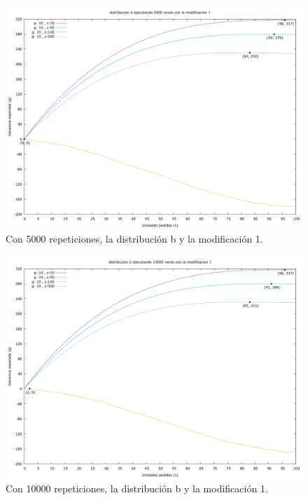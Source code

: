 \documentclass[12pt, spanish]{article}
\begin{document}
\begin{figure}[H]
	\centering
	\includegraphics[scale = 0.3]{prob_b/datos_b_5000_1.png}
	\caption{Con 5000 repeticiones, la distribución b y la modificación 1.}
	\label{fig:ej1_a_5000}

\end{figure}


\begin{figure}[H]
	\centering
	\includegraphics[scale = 0.3]{prob_b/datos_b_10000_1.png}
	\caption{Con 10000 repeticiones, la distribución b y la modificación 1.}
	\label{fig:ej1_a_10000}

\end{figure}
\end{document}
